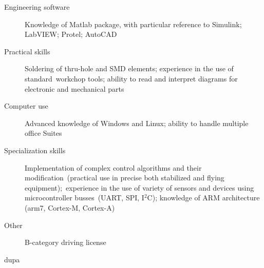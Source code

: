 \documentclass[]{friggeri-cv}
\begin{document}
\begin{description}
  \item [Engineering software] Knowledge of Matlab package, with particular reference to Simulink; LabVIEW; Protel; AutoCAD
  \item [Practical skills] Soldering of thru-hole and SMD elements; experience in the use of standard\
    workchop tools; ability to read and interpret diagrams for electronic and mechanical parts
  \item [Computer use] Advanced knowledge of Windows and Linux; ability to handle multiple office Suites
  \item [Specialization skills] Implementation of complex control algorithms and their modification\
    (practical use in precise both stabilized and flying equipment);\ 
    experience in the use of variety of sensors and devices using microcontroller busses\
    (UART, SPI, {\normalfont I\(^{2}\)C}); knowledge of ARM architecture (arm7, Cortex-M, Cortex-A)
  \item [Other] B-category driving license
\end{description}
\null
\vfill
dupa
% 
\end{document}
